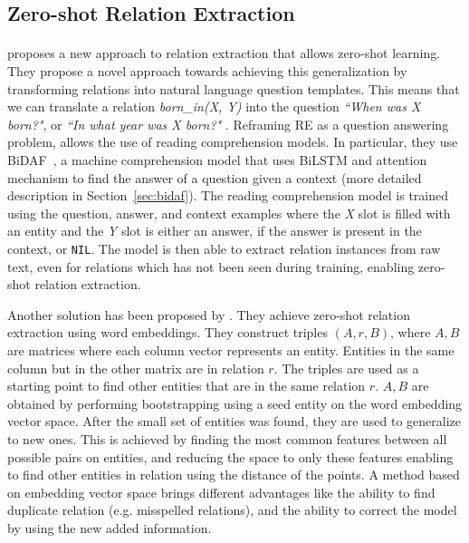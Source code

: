 \subsection{Zero-shot Relation Extraction}
\paragraph{}
\cite{levy2017zero} proposes a new approach to relation extraction that allows zero-shot learning. They propose a novel approach towards achieving this generalization by transforming relations into natural language question templates. This means that we can translate a relation \textit{born\_in(X, Y)} into the question \textit{``When was X born?"}, or \textit{``In what year was X born?"} . Reframing RE as a question answering problem, allows the use of reading comprehension models. In particular, they use BiDAF~\citep{seo2016bidirectional}, a machine comprehension model that uses BiLSTM and attention mechanism to find the answer of a question given a context (more detailed description in Section~\ref{sec:bidaf}). The reading comprehension model is trained using the question, answer, and context examples where the \textit{X} slot is filled with an entity and the \textit{Y} slot is either an answer, if the answer is present in the context, or \texttt{NIL}. The model is then able to extract relation instances from raw text, even for relations which has not been seen during training, enabling zero-shot relation extraction.

Another solution has been proposed by \cite{goldstein2018zero}. They achieve zero-shot relation extraction using word embeddings. They  construct triples $(A, r, B)$, where $A, B$ are matrices where each column vector represents an entity. Entities in the same column but in the other matrix are in relation $r$. The triples are used as a starting point to find other entities that are in the same relation $r$. $A, B$ are obtained by performing bootstrapping using a seed entity on the word embedding vector space. After the small set of entities was found, they are used to generalize to new ones. This is achieved by finding the most common features between all possible pairs on entities, and reducing the space to only these features enabling to find other entities in relation using the distance of the points. A method based on embedding vector space brings different advantages like the ability to find duplicate relation (e.g. misspelled relations), and the ability to correct the model by using the new added information. 
 

